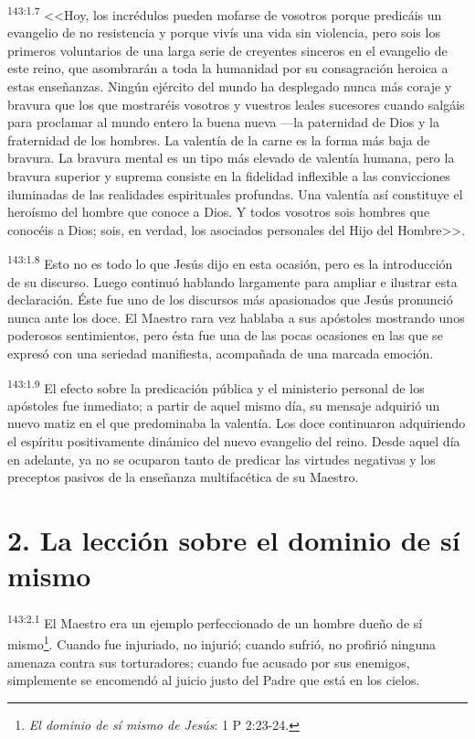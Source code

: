 \par 
\textsuperscript{143:1.7} <<Hoy, los incrédulos pueden mofarse de vosotros porque predicáis un evangelio de no resistencia y porque vivís una vida sin violencia, pero sois los primeros voluntarios de una larga serie de creyentes sinceros en el evangelio de este reino, que asombrarán a toda la humanidad por su consagración heroica a estas enseñanzas. Ningún ejército del mundo ha desplegado nunca más coraje y bravura que los que mostraréis vosotros y vuestros leales sucesores cuando salgáis para proclamar al mundo entero la buena nueva ---la paternidad de Dios y la fraternidad de los hombres. La valentía de la carne es la forma más baja de bravura. La bravura mental es un tipo más elevado de valentía humana, pero la bravura superior y suprema consiste en la fidelidad inflexible a las convicciones iluminadas de las realidades espirituales profundas. Una valentía así constituye el heroísmo del hombre que conoce a Dios. Y todos vosotros sois hombres que conocéis a Dios; sois, en verdad, los asociados personales del Hijo del Hombre>>.

\par 
\textsuperscript{143:1.8} Esto no es todo lo que Jesús dijo en esta ocasión, pero es la introducción de su discurso. Luego continuó hablando largamente para ampliar e ilustrar esta declaración. Éste fue uno de los discursos más apasionados que Jesús pronunció nunca ante los doce. El Maestro rara vez hablaba a sus apóstoles mostrando unos poderosos sentimientos, pero ésta fue una de las pocas ocasiones en las que se expresó con una seriedad manifiesta, acompañada de una marcada emoción.

\par 
\textsuperscript{143:1.9} El efecto sobre la predicación pública y el ministerio personal de los apóstoles fue inmediato; a partir de aquel mismo día, su mensaje adquirió un nuevo matiz en el que predominaba la valentía. Los doce continuaron adquiriendo el espíritu positivamente dinámico del nuevo evangelio del reino. Desde aquel día en adelante, ya no se ocuparon tanto de predicar las virtudes negativas y los preceptos pasivos de la enseñanza multifacética de su Maestro.

\section*{2. La lección sobre el dominio de sí mismo}
\par 
\textsuperscript{143:2.1} El Maestro era un ejemplo perfeccionado de un hombre dueño de sí mismo\footnote{\textit{El dominio de sí mismo de Jesús}: 1 P 2:23-24.}. Cuando fue injuriado, no injurió; cuando sufrió, no profirió ninguna amenaza contra sus torturadores; cuando fue acusado por sus enemigos, simplemente se encomendó al juicio justo del Padre que está en los cielos.

